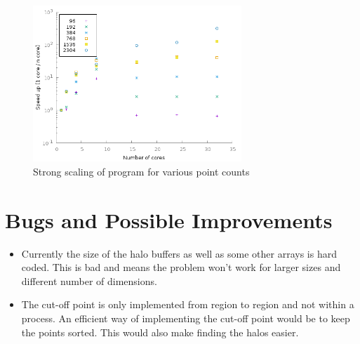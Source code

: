 \documentclass[11pt]{article}
\begin{document}
\begin{figure}[h]
  \centering
  \caption{Strong scaling of program for various point counts}
  \includegraphics[width=0.7\textwidth]{../images/speedup.png}
\end{figure}

\pagebreak

\section*{Bugs and Possible Improvements}

\begin{itemize}
\item Currently the size of the halo buffers as well as some other arrays is hard coded. This is bad and means the problem won't work for larger sizes and different number of dimensions. 
\item The cut-off point is only implemented from region to region and not within a process. An efficient way of implementing the cut-off point would be to keep the points sorted. This would also make finding the halos easier.
\end{itemize}
\end{document}
